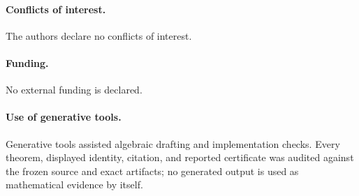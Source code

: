 \paragraph{Conflicts of interest.}
The authors declare no conflicts of interest.

\paragraph{Funding.}
No external funding is declared.

\paragraph{Use of generative tools.}
Generative tools assisted algebraic drafting and implementation checks.
Every theorem, displayed identity, citation, and reported certificate was
audited against the frozen source and exact artifacts; no generated output is
used as mathematical evidence by itself.
